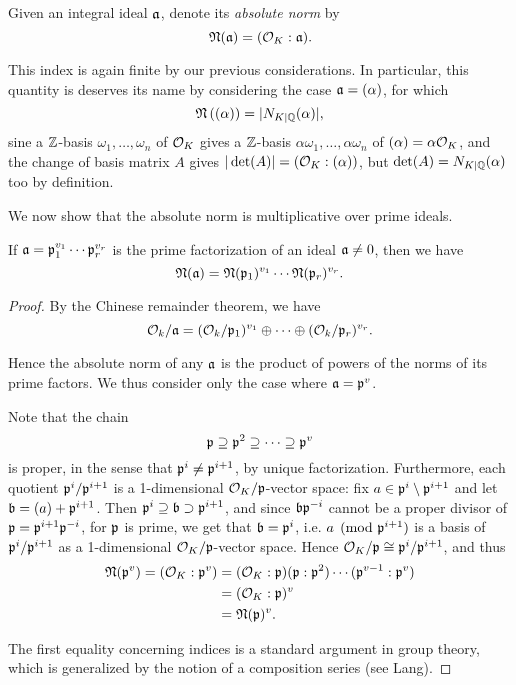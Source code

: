 Given an integral ideal $\mathfrak{a}$, denote its \emph{absolute norm} by
\[
	\mathfrak{N}(\mathfrak{a}) = (\mathcal{O}_K:\mathfrak{a}).
\]

This index is again finite by our previous considerations. In particular, this quantity is deserves its name by considering the case $\mathfrak{a}=(\alpha)$, for which
\[
	\mathfrak{N}\left((\alpha)\right) = |N_{K\mid\mathbb{Q}}(\alpha)|,
\]
sine a $\mathbb{Z}$-basis $\omega_1,\dots,\omega_n$ of $\mathcal{O}_K$ gives a $\mathbb{Z}$-basis $\alpha\omega_1,\dots,\alpha\omega_n$ of $(\alpha)=\alpha\mathcal{O}_K$, and the change of basis matrix $A$ gives $|\det(A)|=(\mathcal{O}_K:(\alpha))$, but $\det(A)=N_{K\mid\mathbb{Q}}(\alpha)$ too by definition.

We now show that the absolute norm is multiplicative over prime ideals.

\begin{prop}[Neukirch 6.1]
	If $\mathfrak{a}=\mathfrak{p}_1^{v_1}\cdots\mathfrak{p}_r^{v_r}$ is the prime factorization of an ideal $\mathfrak{a}\neq 0$, then we have
	\[
		\mathfrak{N}(\mathfrak{a}) = \mathfrak{N}(\mathfrak{p}_1)^{v_1}\cdots\mathfrak{N}(\mathfrak{p}_r)^{v_r}.
	\]
\end{prop}
\begin{proof}
	By the Chinese remainder theorem, we have
	\[
		\mathcal{O}_k/\mathfrak{a} = (\mathcal{O}_k/\mathfrak{p}_1)^{v_1}\oplus\cdots\oplus(\mathcal{O}_k/\mathfrak{p}_r)^{v_r}.
	\]
	
	Hence the absolute norm of any $\mathfrak{a}$ is the product of powers of the norms of its prime factors. We thus consider only the case where $\mathfrak{a}=\mathfrak{p}^v$.

	Note that the chain
	\[
		\mathfrak{p} \supseteq \mathfrak{p}^2 \supseteq \cdots \supseteq \mathfrak{p}^v
	\]
	is proper, in the sense that $\mathfrak{p}^i\neq\mathfrak{p}^{i+1}$, by unique factorization. Furthermore, each quotient $\mathfrak{p}^i/\mathfrak{p}^{i+1}$ is a 1-dimensional $\mathcal{O}_K/\mathfrak{p}$-vector space: fix $a\in\mathfrak{p}^i\setminus \mathfrak{p}^{i+1}$ and let $\mathfrak{b}=(a)+\mathfrak{p}^{i+1}$. Then $\mathfrak{p}^i\supseteq\mathfrak{b}\supset\mathfrak{p}^{i+1}$, and since $\mathfrak{b}\mathfrak{p}^{-i}$ cannot be a proper divisor of $\mathfrak{p}=\mathfrak{p}^{i+1}\mathfrak{p}^{-i}$, for $\mathfrak{p}$ is prime, we get that $\mathfrak{b}=\mathfrak{p}^i$, i.e. $a\pmod{\mathfrak{p}^{i+1}}$ is a basis of $\mathfrak{p}^i/\mathfrak{p}^{i+1}$ as a 1-dimensional $\mathcal{O}_K/\mathfrak{p}$-vector space. Hence $\mathcal{O}_K/\mathfrak{p}\cong\mathfrak{p}^i/\mathfrak{p}^{i+1}$, and thus
	\begin{align*}
		\mathfrak{N}(\mathfrak{p}^v) = (\mathcal{O}_K : \mathfrak{p}^v) &= (\mathcal{O}_K:\mathfrak{p})(\mathfrak{p}:\mathfrak{p}^2)\cdots(\mathfrak{p}^{v-1}:\mathfrak{p}^v)\\
			&= (\mathcal{O}_K:\mathfrak{p})^v\\
			&= \mathfrak{N}(\mathfrak{p})^v.
	\end{align*}

	The first equality concerning indices is a standard argument in group theory, which is generalized by the notion of a composition series (see Lang).
\end{proof}

